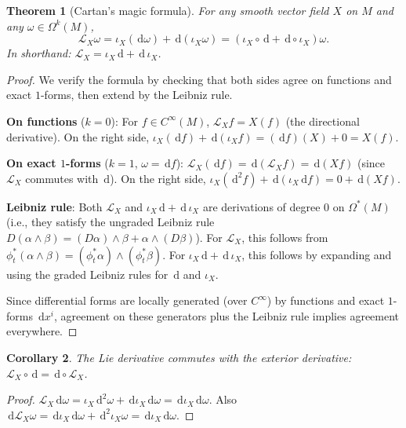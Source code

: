 \documentclass[12pt,a4paper,openany]{book}
\newtheorem{theorem}{Theorem}[section]
\newtheorem{corollary}[theorem]{Corollary}
\theoremstyle{definition}
\theoremstyle{remark}
\newcommand{\dd}{\,\mathrm{d}}
\begin{document}
\begin{theorem}[Cartan's magic formula]\label{thm:cartan-formula}
For any smooth vector field $X$ on $M$ and any $\omega \in \Omega^k(M)$,
\[
  \mathcal{L}_X \omega = \iota_X(\dd\omega) + \dd(\iota_X \omega)
  = (\iota_X \circ \dd + \dd \circ \iota_X)\omega.
\]
In shorthand: $\mathcal{L}_X = \iota_X \dd + \dd\, \iota_X$.
\end{theorem}

\begin{proof}
We verify the formula by checking that both sides agree on functions and
exact $1$-forms, then extend by the Leibniz rule.

\medskip\noindent
\textbf{On functions} ($k = 0$): For $f \in C^\infty(M)$,
$\mathcal{L}_X f = X(f)$ (the directional derivative). On the right side,
$\iota_X(\dd f) + \dd(\iota_X f) = (\dd f)(X) + 0 = X(f)$.

\medskip\noindent
\textbf{On exact $1$-forms} ($k = 1$, $\omega = \dd f$):
$\mathcal{L}_X(\dd f) = \dd(\mathcal{L}_X f) = \dd(Xf)$ (since
$\mathcal{L}_X$ commutes with $\dd$). On the right side,
$\iota_X(\dd^2 f) + \dd(\iota_X \dd f) = 0 + \dd(Xf)$.

\medskip\noindent
\textbf{Leibniz rule}: Both $\mathcal{L}_X$ and $\iota_X \dd + \dd\, \iota_X$
are derivations of degree $0$ on $\Omega^*(M)$ (i.e., they satisfy the
ungraded Leibniz rule $D(\alpha \wedge \beta) = (D\alpha) \wedge \beta
+ \alpha \wedge (D\beta)$). For $\mathcal{L}_X$, this follows from
$\phi_t^*(\alpha \wedge \beta) = (\phi_t^*\alpha) \wedge (\phi_t^*\beta)$.
For $\iota_X \dd + \dd\, \iota_X$, this follows by expanding and using
the graded Leibniz rules for $\dd$ and $\iota_X$.

Since differential forms are locally generated (over $C^\infty$) by functions
and exact $1$-forms $\dd x^i$, agreement on these generators plus the
Leibniz rule implies agreement everywhere.
\end{proof}

\begin{corollary}\label{cor:lie-derivative-commutes-d}
The Lie derivative commutes with the exterior derivative:
$\mathcal{L}_X \circ \dd = \dd \circ \mathcal{L}_X$.
\end{corollary}

\begin{proof}
$\mathcal{L}_X \dd\omega = \iota_X \dd^2\omega + \dd\iota_X \dd\omega
= \dd\iota_X \dd\omega$. Also
$\dd\mathcal{L}_X\omega = \dd\iota_X\dd\omega + \dd^2\iota_X\omega
= \dd\iota_X\dd\omega$.
\end{proof}
\end{document}
